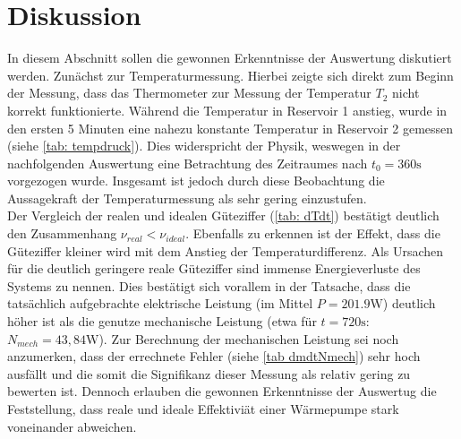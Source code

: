 \section{Diskussion}
In diesem Abschnitt sollen die gewonnen Erkenntnisse der Auswertung diskutiert werden. Zunächst zur Temperaturmessung.
Hierbei zeigte sich direkt zum Beginn der Messung, dass das Thermometer zur Messung der Temperatur $T_2$ nicht korrekt
funktionierte. Während die Temperatur in Reservoir 1 anstieg, wurde in den ersten 5 Minuten eine nahezu konstante Temperatur
in Reservoir 2 gemessen (siehe \ref{tab: tempdruck}). Dies widerspricht der Physik, weswegen in der nachfolgenden Auswertung
eine Betrachtung des Zeitraumes nach $t_0 = 360\si{\second}$ vorgezogen wurde. Insgesamt ist jedoch durch diese Beobachtung
die Aussagekraft der Temperaturmessung als sehr gering einzustufen. \\
Der Vergleich der realen und idealen Güteziffer (\ref{tab: dTdt}) bestätigt deutlich den Zusammenhang $\nu_{real} < \nu_{ideal}$. Ebenfalls
zu erkennen ist der Effekt, dass die Güteziffer kleiner wird mit dem Anstieg der Temperaturdifferenz. Als Ursachen für die deutlich
geringere reale Güteziffer sind immense Energieverluste des Systems zu nennen. Dies bestätigt sich vorallem in der Tatsache, dass die tatsächlich
aufgebrachte elektrische Leistung (im Mittel $P = 201.9 \si{\watt}$) deutlich höher ist als die genutze mechanische Leistung (etwa
für $t = 720 \si{\second}$: $N_{mech} = 43,84 \si{\watt}$). Zur Berechnung der mechanischen Leistung sei noch anzumerken, dass der errechnete
Fehler (siehe \ref{tab dmdtNmech}) sehr hoch ausfällt und die somit die Signifikanz dieser Messung als relativ gering zu bewerten ist. Dennoch
erlauben die gewonnen Erkenntnisse der Auswertug die Feststellung, dass reale und ideale Effektiviät einer Wärmepumpe stark voneinander abweichen.
